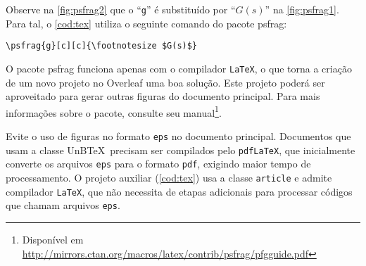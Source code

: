 

Observe na \cref{fig:psfrag2} que o ``\texttt{g}'' é substituído por ``$G(s)$'' na \cref{fig:psfrag1}. Para tal, o \cref{cod:tex} utiliza o seguinte comando do pacote \textsf{psfrag}:
\begin{verbatim}
\psfrag{g}[c][c]{\footnotesize $G(s)$}
\end{verbatim}

O pacote \textsf{psfrag} funciona apenas com o compilador \texttt{LaTeX}, o que torna a criação de um novo projeto no Overleaf uma boa solução. Este projeto poderá ser aproveitado para gerar outras figuras do documento principal. Para mais informações sobre o pacote, consulte seu manual\footnote{Disponível em \url{http://mirrors.ctan.org/macros/latex/contrib/psfrag/pfgguide.pdf}}.

Evite o uso de figuras no formato \texttt{eps} no documento principal. Documentos que usam a classe UnB\TeX\ precisam ser compilados pelo \texttt{pdfLaTeX}, que inicialmente converte os arquivos \texttt{eps} para o formato \texttt{pdf}, exigindo maior tempo de processamento. O projeto auxiliar (\cref{cod:tex}) usa a classe \texttt{article} e admite compilador \texttt{LaTeX}, que não necessita de etapas adicionais para processar códigos que chamam arquivos \texttt{eps}.